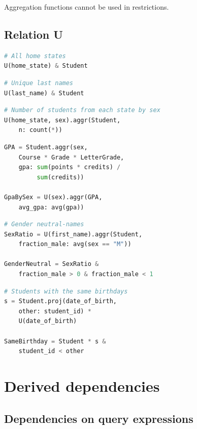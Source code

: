 \documentclass[letter,10pt]{article}
\begin{document}
Aggregation functions cannot be used in restrictions. 
\subsection{Relation U}
\begin{lstlisting}[language=Python, morekeywords={avg, U}]
# All home states
U(home_state) & Student
\end{lstlisting}

\begin{lstlisting}[language=Python, morekeywords={avg, U}]
# Unique last names
U(last_name) & Student 
\end{lstlisting}

\begin{lstlisting}[language=Python, morekeywords={avg, U}]
# Number of students from each state by sex
U(home_state, sex).aggr(Student, 
    n: count(*))
\end{lstlisting}

\begin{lstlisting}[language=Python, morekeywords={avg, U}]
GPA = Student.aggr(sex,
    Course * Grade * LetterGrade,
    gpa: sum(points * credits) /
         sum(credits))

GpaBySex = U(sex).aggr(GPA, 
    avg_gpa: avg(gpa))
\end{lstlisting}

\begin{lstlisting}[language=Python, morekeywords={avg, U}]
# Gender neutral-names
SexRatio = U(first_name).aggr(Student, 
    fraction_male: avg(sex == "M")) 

GenderNeutral = SexRatio & 
    fraction_male > 0 & fraction_male < 1
\end{lstlisting}

\begin{lstlisting}[language=Python, morekeywords={avg, U}]
# Students with the same birthdays
s = Student.proj(date_of_birth, 
    other: student_id) * 
    U(date_of_birth)

SameBirthday = Student * s & 
    student_id < other
\end{lstlisting}

\section{Derived dependencies}\label{sec:def2}
\subsection{Dependencies on query expressions}
\end{document}

